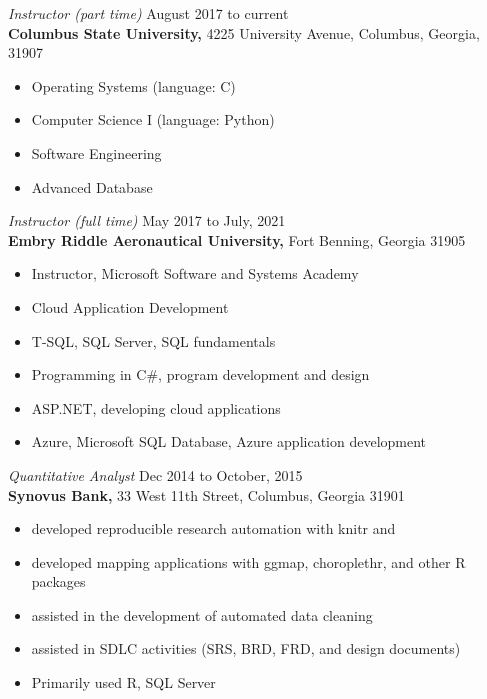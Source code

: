 \documentclass[margin, 10pt]{res} %
\begin{document}
\begin{resume}
 
{\it Instructor (part time)} \hfill August 2017 to current \\
\textbf{Columbus State University,} \hfill 4225 University Avenue, Columbus, Georgia, 31907
\begin{itemize} \itemsep -2pt %
\item Operating Systems (language: C)
\item Computer Science I (language: Python)
\item Software Engineering
\item Advanced Database
\end{itemize}

{\it Instructor (full time)} \hfill May 2017 to July, 2021 \\
\textbf{Embry Riddle Aeronautical University,} \hfill Fort Benning, Georgia 31905 \\
\begin{itemize} \itemsep -2pt %
\item Instructor, Microsoft Software and Systems Academy
\item Cloud Application Development
\item T-SQL, SQL Server, SQL fundamentals
\item Programming in C\#, program development and design
\item ASP.NET, developing cloud applications
\item Azure, Microsoft SQL Database, Azure application development
\end{itemize}

{\it Quantitative Analyst} \hfill Dec 2014 to October, 2015 \\
\textbf{Synovus Bank,} \hfill 33 West 11th Street, Columbus, Georgia 31901
\begin{itemize} \itemsep -2pt %
\item developed reproducible research automation with knitr and \LaTeXe
\item developed mapping applications with ggmap, choroplethr, and other \textsf{R} packages
\item assisted in the development of automated data cleaning 
\item assisted in SDLC activities (SRS, BRD, FRD, and design documents)
\item Primarily used \textsf{R}, SQL Server
\end{itemize}
 

\end{resume}
\end{document}
